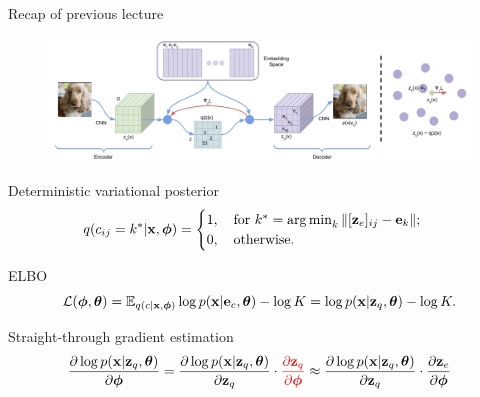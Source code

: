 

\usepackage{tikz}

\usetikzlibrary{arrows,shapes,positioning,shadows,trees}

\begin{frame}
\titlepage
\end{frame}
\begin{frame}{Recap of previous lecture}
	\begin{figure}
		\centering
		\includegraphics[width=0.85\linewidth]{figs/vqvae}
	\end{figure}
	\vspace{-0.3cm}
	\begin{block}{Deterministic variational posterior}
		\vspace{-0.8cm}
		\[
			q(c_{ij} = k^* | \mathbf{x}, \boldsymbol{\phi}) = \begin{cases}
				1 , \quad \text{for } k^* = \operatorname*{arg\,min}_k \| [\mathbf{z}_e]_{ij} - \mathbf{e}_k \|; \\
				0, \quad \text{otherwise}.
			\end{cases}
		\]
		\vspace{-0.8cm}
	\end{block}
	\begin{block}{ELBO}
		\vspace{-0.6cm}
		\[
			\mathcal{L} (\boldsymbol{\phi}, \boldsymbol{\theta})  = \mathbb{E}_{q(c | \mathbf{x}, \boldsymbol{\phi})} \log p(\mathbf{x} | \mathbf{e}_{c} , \boldsymbol{\theta}) - \log K =  \log p(\mathbf{x} | \mathbf{z}_q, \boldsymbol{\theta}) - \log K.
		\]
		\vspace{-0.6cm}
	\end{block}
	\begin{block}{Straight-through gradient estimation}
		\vspace{-0.6cm}
		\[
			\frac{\partial \log p(\mathbf{x} | \mathbf{z}_q , \boldsymbol{\theta})}{\partial \boldsymbol{\phi}} = \frac{\partial \log p(\mathbf{x} | \mathbf{z}_q, \boldsymbol{\theta})}{\partial \mathbf{z}_q} \cdot {\color{red}\frac{\partial \mathbf{z}_q}{\partial \boldsymbol{\phi}}} \approx \frac{\partial \log p(\mathbf{x} | \mathbf{z}_q, \boldsymbol{\theta})}{\partial \mathbf{z}_q} \cdot \frac{\partial \mathbf{z}_e}{\partial \boldsymbol{\phi}}
		\]
	\end{block}
\end{frame}
